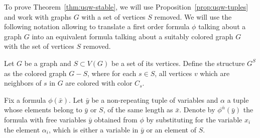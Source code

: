 \medskip
To prove Theorem~\ref{thm:uqw-stable}, we will use Proposition~\ref{prop:uqw-tuples} and work with graphs $G$
with a set of vertices $S$ removed.
We will use the following notation allowing to translate a first order formula $\phi$ talking about a graph $G$ into an equivalent formula talking about a suitably colored  graph $G$ with the set of vertices $S$ removed.

Let $G$ be a graph and $S\subset V(G)$
be a set of its vertices.
Define the structure $G^{S}$
as the colored graph $G-S$, where for each $s\in S$, all vertices $v$
which are neighbors of $s$ in $G$ are colored with color $C_s$.

Fix a formula $\phi(\bar x)$.
Let $\bar y$ be a non-repeating tuple of variables and $\alpha$ a tuple whose elements belong to $\bar y$ or $S$, of the same length as $\bar x$.
Denote by $\phi^{\bar \alpha}(\bar y)$ the formula with free variables $\bar y$ obtained from $\phi$ by substituting for the variable $x_i$ the element $\alpha_i$, which is either a variable in $\bar y$  or an element of $S$. 


